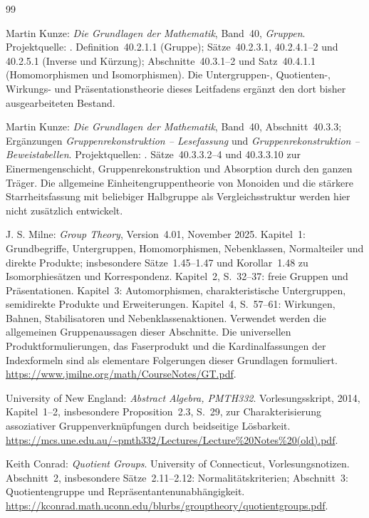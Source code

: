 \renewcommand{\bibname}{Quellen und Anschlüsse im Projekt}
\begin{thebibliography}{99}
\small
{}

Martin Kunze: \emph{Die Grundlagen der Mathematik}, Band~40,
\emph{Gruppen}.
Projektquelle: .
Definition~40.2.1.1 (Gruppe); Sätze~40.2.3.1, 40.2.4.1--2 und
40.2.5.1 (Inverse und Kürzung); Abschnitte~40.3.1--2 und
Satz~40.4.1.1 (Homomorphismen und Isomorphismen).
Die Untergruppen-, Quotienten-, Wirkungs- und Präsentationstheorie
dieses Leitfadens ergänzt den dort bisher ausgearbeiteten Bestand.

Martin Kunze: \emph{Die Grundlagen der Mathematik}, Band~40,
Abschnitt~40.3.3; Ergänzungen \emph{Gruppenrekonstruktion --
Lesefassung} und \emph{Gruppenrekonstruktion -- Beweistabellen}.
Projektquellen: .
Sätze~40.3.3.2--4 und 40.3.3.10 zur Einermengenschicht,
Gruppenrekonstruktion und Absorption durch den ganzen Träger.
Die allgemeine Einheitengruppentheorie von Monoiden und die
stärkere Starrheitsfassung mit beliebiger Halbgruppe als
Vergleichsstruktur werden hier nicht zusätzlich entwickelt.

J. S. Milne: \emph{Group Theory}, Version~4.01, November 2025.
Kapitel~1: Grundbegriffe, Untergruppen, Homomorphismen, Nebenklassen,
Normalteiler und direkte Produkte; insbesondere
Sätze~1.45--1.47 und Korollar~1.48 zu Isomorphiesätzen und Korrespondenz.
Kapitel~2, S.~32--37: freie Gruppen und Präsentationen.
Kapitel~3: Automorphismen, charakteristische Untergruppen,
semidirekte Produkte und Erweiterungen.
Kapitel~4, S.~57--61: Wirkungen, Bahnen, Stabilisatoren und Nebenklassenaktionen.
Verwendet werden die allgemeinen Gruppenaussagen dieser Abschnitte.
Die universellen Produktformulierungen, das Faserprodukt und die
Kardinalfassungen der Indexformeln sind als elementare Folgerungen
dieser Grundlagen formuliert.
\url{https://www.jmilne.org/math/CourseNotes/GT.pdf}.

University of New England: \emph{Abstract Algebra, PMTH332}.
Vorlesungsskript, 2014, Kapitel~1--2, insbesondere
Proposition~2.3, S.~29, zur Charakterisierung assoziativer
Gruppenverknüpfungen durch beidseitige Lösbarkeit.
\url{https://mcs.une.edu.au/~pmth332/Lectures/Lecture%20Notes%20(old).pdf}.

Keith Conrad: \emph{Quotient Groups}.
University of Connecticut, Vorlesungsnotizen.
Abschnitt~2, insbesondere Sätze~2.11--2.12:
Normalitätskriterien; Abschnitt~3: Quotientengruppe
und Repräsentantenunabhängigkeit.
\url{https://kconrad.math.uconn.edu/blurbs/grouptheory/quotientgroups.pdf}.


\end{thebibliography}
